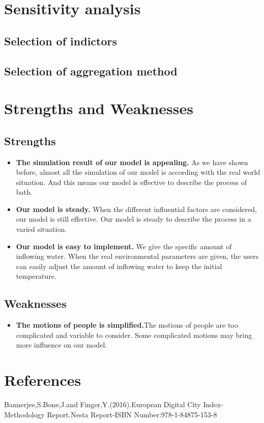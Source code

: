 \documentclass{mcmthesis}
\begin{document}
\section{Sensitivity analysis}
\subsection{Selection of indictors}%
\subsection{Selection of aggregation method}%
\section{Strengths and Weaknesses}
\subsection{Strengths}
\begin{itemize}
\item{\textbf{The simulation result of our model is appealing.} As we have shown before, almost all the simulation of our model is according with the real world situation. And this means our model is effective to describe the process of bath.}
\item{\textbf{Our model is steady.} When the different influential factors are considered, our model is still effective. Our model is steady to describe the process in a varied situation. }
\item{\textbf{Our model is easy to implement.} We give the specific amount of inflowing water. When the real environmental parameters are given, the users can easily adjust the amount of inflowing water to keep the initial temperature. }
\end{itemize}
\subsection{Weaknesses}
\begin{itemize}
\item{\textbf{The motions of people is simplified.}The motions of people are too complicated and variable to consider. Some complicated motions may bring more influence on our model. }
\end{itemize}


\section{References}
\begin{thebibliography}{99}
Bannerjee,S.Bone,J.and Finger,Y.(2016).European Digital City Index-Methodology Report.Nesta Report-ISBN Number:978-1-84875-153-8
\end{thebibliography}

\begin{appendices}
\end{appendices}
\end{document}
